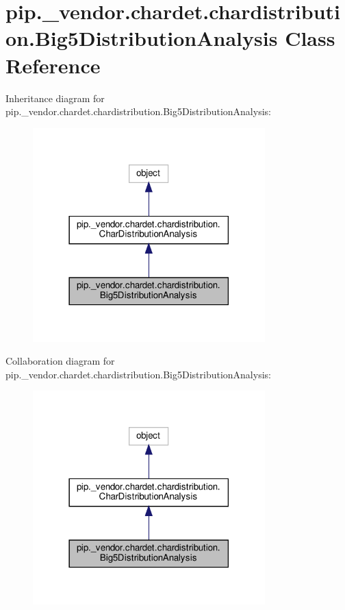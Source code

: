 \hypertarget{classpip_1_1__vendor_1_1chardet_1_1chardistribution_1_1Big5DistributionAnalysis}{}\section{pip.\+\_\+vendor.\+chardet.\+chardistribution.\+Big5\+Distribution\+Analysis Class Reference}
\label{classpip_1_1__vendor_1_1chardet_1_1chardistribution_1_1Big5DistributionAnalysis}


Inheritance diagram for pip.\+\_\+vendor.\+chardet.\+chardistribution.\+Big5\+Distribution\+Analysis\+:
\nopagebreak
\begin{figure}[H]
\begin{center}
\leavevmode
\includegraphics[width=254pt]{classpip_1_1__vendor_1_1chardet_1_1chardistribution_1_1Big5DistributionAnalysis__inherit__graph}
\end{center}
\end{figure}


Collaboration diagram for pip.\+\_\+vendor.\+chardet.\+chardistribution.\+Big5\+Distribution\+Analysis\+:
\nopagebreak
\begin{figure}[H]
\begin{center}
\leavevmode
\includegraphics[width=254pt]{classpip_1_1__vendor_1_1chardet_1_1chardistribution_1_1Big5DistributionAnalysis__coll__graph}
\end{center}
\end{figure}

